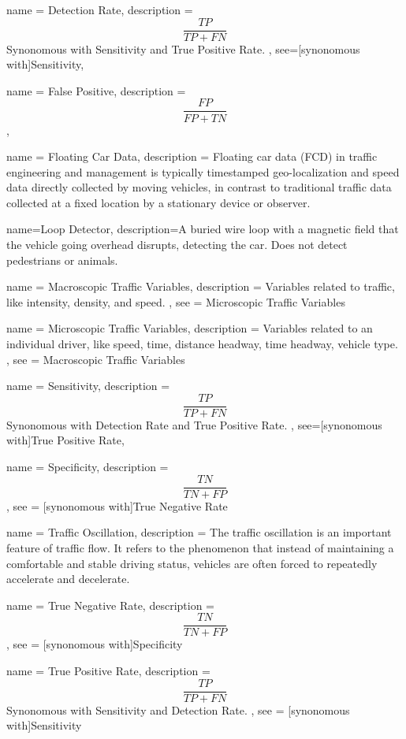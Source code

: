{
	name = {Detection Rate},
	description = {
		$$\frac{TP}{TP+FN}$$
		Synonomous with Sensitivity and True Positive Rate.
	},
	see=[synonomous with]{Sensitivity},
}

{
	name = {False Positive},
	description = {
		$$\frac{FP}{FP+TN}$$
	},
}



{
	name = Floating Car Data,
	description = {Floating car data (FCD) in traffic engineering and management is typically timestamped geo-localization and speed data directly collected by moving vehicles, in contrast to traditional traffic data collected at a fixed location by a stationary device or observer.}
}

{
        name=Loop Detector,
        description={A buried wire loop with a magnetic field that the vehicle going overhead disrupts, detecting the car.  Does not detect pedestrians or animals.  }
}

{
	name = Macroscopic Traffic Variables,
	description = {
		Variables related to traffic, like intensity, density, and speed.
	},
	see = {Microscopic Traffic Variables}
}

{
	name = Microscopic Traffic Variables,
	description = {
		Variables related to an individual driver, like speed, time, distance headway, time headway, vehicle type.
	},
	see = {Macroscopic Traffic Variables}
}

{
	name = {Sensitivity},
	description = {
		$$\frac{TP}{TP+FN}$$
		Synonomous with Detection Rate and True Positive Rate.
	},
	see=[synonomous with]{True Positive Rate},
}

{
	name = {Specificity},
	description = {
		$$\frac{TN}{TN+FP}$$
	},
	see = [synonomous with]{True Negative Rate}
}

{
	name = Traffic Oscillation,
	description = {
		The traffic oscillation is an important feature of traffic flow. It refers to the phenomenon that instead of maintaining a comfortable and stable driving status, vehicles are often forced to repeatedly accelerate and decelerate.
	}
}

{
	name = True Negative Rate,
	description = {
		$$\frac{TN}{TN+FP}$$
	},
	see = [synonomous with]{Specificity}
}

{
	name = True Positive Rate,
	description = {
		$$\frac{TP}{TP+FN}$$
		Synonomous with Sensitivity and Detection Rate.
	},
	see = [synonomous with]{Sensitivity}
}





